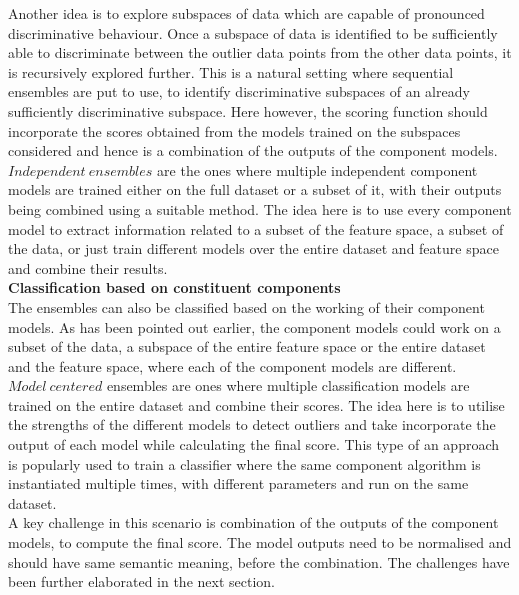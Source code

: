 Another idea is to explore subspaces of data which are capable of pronounced discriminative behaviour. Once a subspace of data is identified to be sufficiently able to discriminate between the outlier data points from the other data points, it is recursively explored further. This is a natural setting where sequential ensembles are put to use, to identify discriminative subspaces of an already sufficiently discriminative subspace. Here however, the scoring function should incorporate the scores obtained from the models trained on the subspaces considered and hence is a combination of the outputs of the component models. \\

$Independent\ ensembles$ are the ones where multiple independent component models are trained either on the full dataset or a subset of it, with their outputs being combined using a suitable method. The idea here is to use every component model to extract information related to a subset of the feature space, a subset of the data, or just train different models over the entire dataset and feature space and combine their results. \\

\noindent \textbf{Classification based on constituent components} \\

The ensembles can also be classified based on the working of their component models. As has been pointed out earlier, the component models could work on a subset of the data, a subspace of the entire feature space or the entire dataset and the feature space, where each of the component models are different. \\

$Model\ centered$ ensembles are ones where multiple classification models are trained on the entire dataset and combine their scores. The idea here is to utilise the strengths of the different models to detect outliers and take incorporate the output of each model while calculating the final score. This type of an approach is popularly used to train a classifier where the same component algorithm is instantiated multiple times, with different parameters and run on the same dataset. \\

A key challenge in this scenario is combination of the outputs of the component models, to compute the final score. The model outputs need to be normalised and should have same semantic meaning, before the combination. The challenges have been further elaborated in the next section. \\

